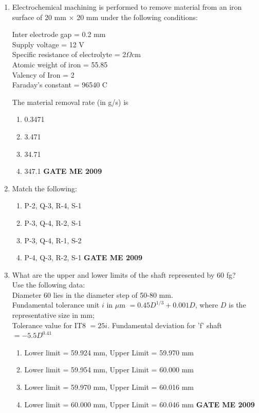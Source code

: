 \documentclass[journal]{IEEEtran}
\begin{document}
\begin{enumerate}[leftmargin=0pt]
\item Electrochemical machining is performed to remove material from an iron surface of 20 mm $\times$ 20 mm under the following conditions: 
\begin{center}
    Inter electrode gap = 0.2 mm\\
    Supply voltage = 12 V\\
    Specific resistance of electrolyte = 2$\Omega$cm\\
    Atomic weight of iron = 55.85\\
    Valency of Iron = 2\\
    Faraday's constant = 96540 C\\
\end{center}
The material removal rate (in g/s) is
\begin{enumerate}[label=(\Alph*)]
  \item 0.3471
  \item 3.471
  \item 34.71
  \item 347.1
\hfill{\textbf{GATE ME 2009}}
\end{enumerate}

\item Match the following:\\
\begin{table}[h]
    \centering
    
    
\end{table}
\begin{enumerate}[label=(\Alph*)]
  \item P-2, Q-3, R-4, S-1
  \item P-3, Q-4, R-2, S-1
  \item P-3, Q-4, R-1, S-2
  \item P-4, Q-3, R-2, S-1
\hfill{\textbf{GATE ME 2009}}
\end{enumerate}

\item What are the upper and lower limits of the shaft represented by 60 fg?\\ Use the following data:
\\ Diameter 60 lies in the diameter step of 50-80 mm. \\
Fundamental tolerance unit $i$ in $\mu$m $= 0.45 D^{1/3} + 0.001 D$, where $D$ is the representative size in mm; \\
Tolerance value for IT8 $= 25i$. Fundamental deviation for 'f' shaft $= -5.5 D^{0.41}$
\begin{enumerate}[label=(\Alph*)]
  \item Lower limit = 59.924 mm, Upper Limit = 59.970 mm
  \item Lower limit = 59.954 mm, Upper Limit = 60.000 mm
  \item Lower limit = 59.970 mm, Upper Limit = 60.016 mm
  \item Lower limit = 60.000 mm, Upper Limit = 60.046 mm
\hfill{\textbf{GATE ME 2009}}
\end{enumerate}


\end{enumerate}
\end{document}
